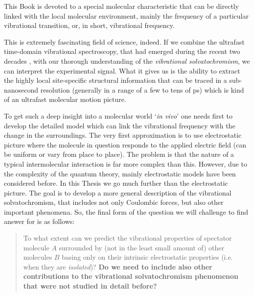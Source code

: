\documentclass[a4paper,titlepage,twoside,fleqn,12pt]{book}
\begin{document}
\begin{refsection}
This Book is devoted to a special molecular characteristic 
that can be directly linked with the local molecular environment, mainly
the frequency of a particular vibrational transition, or, in short, 
vibrational frequency. 

This is extremely fascinating field of science, indeed. If we combine the
ultrafast time\hyp{}domain vibrational spectroscopy, that had emerged during the recent
two decades \citep{Book-Cho.TwoDimensionalOpticalSpectroscopy.2009}, 
with our thorough understanding of the \emph{vibrational solvatochromism},
we can interpret the experimental signal. What it gives us is the 
ability to extract the highly local site\hyp{}specific structural information
that can be traced in a sub-nanosecond resolution (generally in a range of
a few to tens of ps) which is kind of an ultrafast molecular motion picture.

To get such a deep insight into a molecular world `\emph{in vivo}' one needs
first to develop the detailed model which can link the vibrational frequency
with the change in the surroundings. The very first approximation is to use
electrostatic picture where the molecule in question responds to the applied
electric field (can be uniform or vary from place to place). The problem is that
the nature of a typical intermolecular interaction is far more complex than this. However, 
due to the complexity of the quantum theory, mainly electrostatic models
have been considered before. In this Thesis we go much further than the
electrostatic picture. The goal is to develop 
a more general description of the vibrational solvatochromism, that includes
not only Coulombic forces, but also other important phenomena. 
So, the final form of the 
question we will challenge to find answer for is as follows:
%
\begin{quote}
To what extent can we predict the vibrational properties of spectator molecule $A$ 
surrounded by (not in the least small amount of) other molecules $B$
basing only on their intrinsic electrostatic properties 
(i.e. when they are \emph{isolated})? \textbf{Do we need to include also other
contributions to the vibrational solvatochromism phenomenon that were not studied
in detail before?}
\end{quote}
%


\end{refsection}
\end{document}
